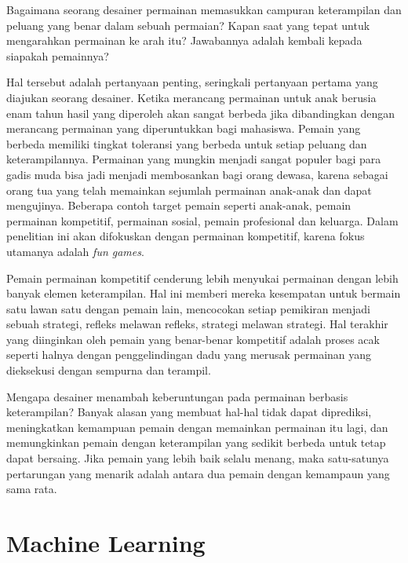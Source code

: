 \begin{subs}
	Bagaimana seorang desainer permainan memasukkan campuran keterampilan dan peluang yang benar dalam sebuah permaian? Kapan saat yang tepat untuk mengarahkan permainan ke arah itu? Jawabannya adalah kembali kepada siapakah pemainnya?
	\vspace{1ex}
	
	Hal tersebut adalah pertanyaan penting, seringkali pertanyaan pertama yang diajukan seorang desainer. Ketika merancang permainan untuk anak berusia enam tahun hasil yang diperoleh akan sangat berbeda jika dibandingkan dengan merancang permainan yang diperuntukkan bagi mahasiswa. Pemain yang berbeda memiliki tingkat toleransi yang berbeda untuk setiap peluang dan keterampilannya. Permainan yang mungkin menjadi sangat populer bagi para gadis muda bisa jadi menjadi membosankan bagi orang dewasa, karena sebagai orang tua yang telah memainkan sejumlah permainan anak-anak dan dapat mengujinya. Beberapa contoh target pemain seperti anak-anak, pemain permainan kompetitif, permainan sosial, pemain profesional dan keluarga. Dalam penelitian ini akan difokuskan dengan permainan kompetitif, karena fokus utamanya adalah \textit{fun games}.
	\vspace{1ex}
	
	Pemain permainan kompetitif cenderung lebih menyukai permainan dengan lebih banyak elemen keterampilan. Hal ini memberi mereka kesempatan untuk bermain satu lawan satu dengan pemain lain, mencocokan setiap pemikiran menjadi sebuah strategi, refleks melawan refleks, strategi melawan strategi. Hal terakhir yang diinginkan oleh pemain yang benar-benar kompetitif adalah proses acak seperti halnya dengan penggelindingan dadu yang merusak permainan yang dieksekusi dengan sempurna dan terampil.
	\vspace{1ex}
	
	Mengapa desainer menambah keberuntungan pada permainan berbasis keterampilan? Banyak alasan yang membuat hal-hal tidak dapat diprediksi, meningkatkan kemampuan pemain dengan memainkan permainan itu lagi, dan memungkinkan pemain dengan keterampilan yang sedikit berbeda untuk tetap dapat bersaing. Jika pemain yang lebih baik selalu menang, maka satu-satunya pertarungan yang menarik adalah antara dua pemain dengan kemampaun yang sama rata.
\end{subs}
\vspace{1ex}

\section{Machine Learning}
\label{sec:sec2_ML}
\vspace{1ex}

